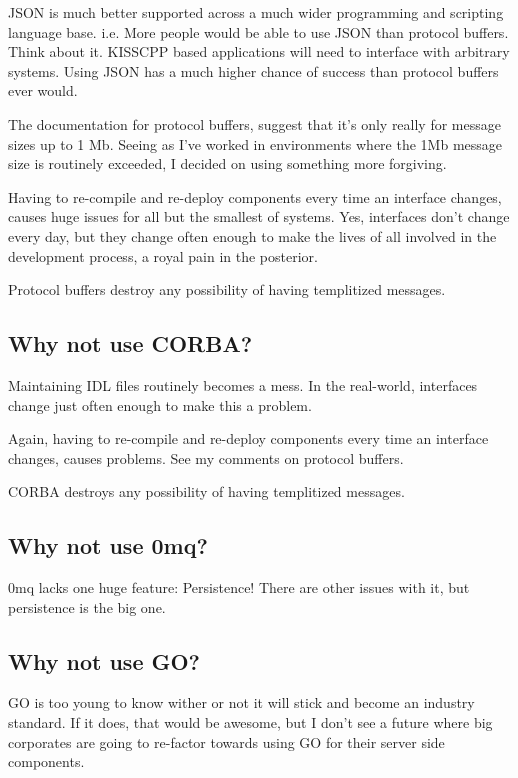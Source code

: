 \begin{DoxyEnumerate}
\item J\-S\-O\-N is much better supported across a much wider programming and scripting language base. i.\-e. More people would be able to use J\-S\-O\-N than protocol buffers. Think about it. K\-I\-S\-S\-C\-P\-P based applications will need to interface with arbitrary systems. Using J\-S\-O\-N has a much higher chance of success than protocol buffers ever would.
\item The documentation for protocol buffers, suggest that it's only really for message sizes up to 1 Mb. Seeing as I've worked in environments where the 1\-Mb message size is routinely exceeded, I decided on using something more forgiving.
\item Having to re-\/compile and re-\/deploy components every time an interface changes, causes huge issues for all but the smallest of systems. Yes, interfaces don't change every day, but they change often enough to make the lives of all involved in the development process, a royal pain in the posterior.
\item Protocol buffers destroy any possibility of having templitized messages.
\end{DoxyEnumerate}

\subsection*{Why not use C\-O\-R\-B\-A?}


\begin{DoxyEnumerate}
\item Maintaining I\-D\-L files routinely becomes a mess. In the real-\/world, interfaces change just often enough to make this a problem.
\item Again, having to re-\/compile and re-\/deploy components every time an interface changes, causes problems. See my comments on protocol buffers.
\item C\-O\-R\-B\-A destroys any possibility of having templitized messages.
\end{DoxyEnumerate}

\subsection*{Why not use 0mq?}

0mq lacks one huge feature\-: Persistence! There are other issues with it, but persistence is the big one.

\subsection*{Why not use G\-O?}

G\-O is too young to know wither or not it will stick and become an industry standard. If it does, that would be awesome, but I don't see a future where big corporates are going to re-\/factor towards using G\-O for their server side components. 